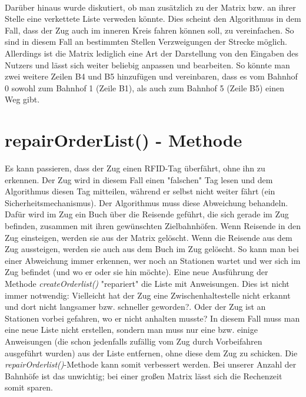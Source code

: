 \\
Darüber hinaus wurde diskutiert, ob man zusätzlich zu der Matrix bzw. an ihrer Stelle eine verkettete Liste verweden könnte. Dies scheint den Algorithmus in dem Fall, dass der Zug auch im inneren Kreis fahren können soll, zu vereinfachen. So sind in diesem Fall an bestimmten Stellen Verzweigungen der Strecke möglich. Allerdings ist die Matrix lediglich eine Art der Darstellung von den Eingaben des Nutzers und lässt sich weiter beliebig anpassen und bearbeiten. So könnte man zwei weitere Zeilen B4 und B5 hinzufügen und vereinbaren, dass es vom Bahnhof 0 sowohl zum Bahnhof 1 (Zeile B1), als auch zum Bahnhof 5 (Zeile B5) einen Weg gibt.\\
%
%
\section{repairOrderList() - Methode}
Es kann passieren, dass der Zug einen RFID-Tag überfährt, ohne ihn zu erkennen. Der Zug wird in diesem Fall einen "falschen" Tag lesen und dem Algorithmus diesen Tag mitteilen, während er selbst nicht weiter fährt (ein Sicherheitsmechanismus). Der Algorithmus muss diese Abweichung behandeln. Dafür wird im Zug ein Buch über die Reisende geführt, die sich gerade im Zug befinden, zusammen mit ihren gewünschten Zielbahnhöfen. Wenn Reisende in den Zug einsteigen, werden sie aus der Matrix gelöscht. Wenn die Reisende aus dem Zug aussteigen, werden sie auch aus dem Buch im Zug gelöscht. So kann man bei einer Abweichung immer erkennen, wer noch an Stationen wartet und wer sich im Zug befindet (und wo er oder sie hin möchte). Eine neue Ausführung der Methode \textit{createOrderlist()} "repariert" die Liste mit Anweisungen. Dies ist nicht immer notwendig: Vielleicht hat der Zug eine Zwischenhaltestelle nicht erkannt und dort nicht langsamer bzw. schneller geworden?. Oder der Zug ist an Stationen vorbei gefahren, wo er nicht anhalten musste? In diesem Fall muss man eine neue Liste nicht erstellen, sondern man muss nur eine bzw. einige Anweisungen (die schon jedenfalls zufällig vom Zug durch Vorbeifahren ausgeführt wurden) aus der Liste entfernen, ohne diese dem Zug zu schicken. Die \textit{repairOrderlist()}-Methode kann somit verbessert werden. Bei unserer Anzahl der Bahnhöfe ist das unwichtig; bei einer großen Matrix lässt sich die Rechenzeit somit sparen.\\
%
%
%
%
